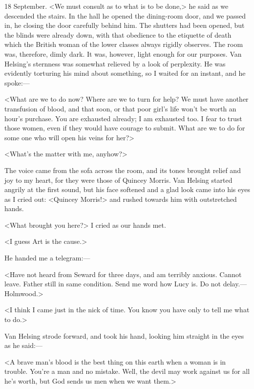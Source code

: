 \begin{diary}{18 September.}
<We must consult as to what is to be done,> he said as we descended the stairs. In the hall he opened the dining-room door, and we passed in, he closing the door carefully behind him. The shutters had been opened, but the blinds were already down, with that obedience to the etiquette of death which the British woman of the lower classes always rigidly observes. The room was, therefore, dimly dark. It was, however, light enough for our purposes. Van Helsing's sternness was somewhat relieved by a look of perplexity. He was evidently torturing his mind about something, so I waited for an instant, and he spoke:—

<What are we to do now? Where are we to turn for help? We must have another transfusion of blood, and that soon, or that poor girl's life won't be worth an hour's purchase. You are exhausted already; I am exhausted too. I fear to trust those women, even if they would have courage to submit. What are we to do for some one who will open his veins for her?>

<What's the matter with me, anyhow?>

The voice came from the sofa across the room, and its tones brought relief and joy to my heart, for they were those of Quincey Morris. Van Helsing started angrily at the first sound, but his face softened and a glad look came into his eyes as I cried out: <Quincey Morris!> and rushed towards him with outstretched hands.

<What brought you here?> I cried as our hands met.

<I guess Art is the cause.>

He handed me a telegram:—

<Have not heard from Seward for three days, and am terribly anxious. Cannot leave. Father still in same condition. Send me word how Lucy is. Do not delay.—Holmwood.>

<I think I came just in the nick of time. You know you have only to tell me what to do.>

Van Helsing strode forward, and took his hand, looking him straight in the eyes as he said:—

<A brave man's blood is the best thing on this earth when a woman is in trouble. You're a man and no mistake. Well, the devil may work against us for all he's worth, but God sends us men when we want them.>


\end{diary}
